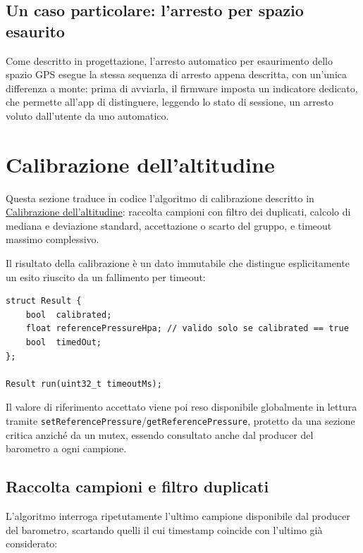 \subsection{Un caso particolare: l'arresto per spazio esaurito}
Come descritto in progettazione, l'arresto automatico per esaurimento dello
spazio GPS esegue la stessa sequenza di arresto appena descritta, con
un'unica differenza a monte: prima di avviarla, il firmware imposta un
indicatore dedicato, che permette all'app di distinguere, leggendo lo stato
di sessione, un arresto voluto dall'utente da uno automatico.

\newpage

\section{Calibrazione dell'altitudine}

Questa sezione traduce in codice l'algoritmo di calibrazione descritto in
\hyperref[sec:calibrazione-altitudine]{Calibrazione dell'altitudine}:
raccolta campioni con filtro dei duplicati, calcolo di mediana e deviazione
standard, accettazione o scarto del gruppo, e timeout massimo complessivo.

Il risultato della calibrazione è un dato immutabile che distingue
esplicitamente un esito riuscito da un fallimento per timeout:

\begin{listing}[H]
\begin{verbatim}
struct Result {
    bool  calibrated;
    float referencePressureHpa; // valido solo se calibrated == true
    bool  timedOut;
};

Result run(uint32_t timeoutMs);
\end{verbatim}
\caption{Interfaccia del modulo di calibrazione dell'altitudine}
\label{listing:altitude-cal-interface}
\end{listing}

Il valore di riferimento accettato viene poi reso disponibile globalmente in
lettura tramite \texttt{setReferencePressure}/\texttt{getReferencePressure},
protetto da una sezione critica anziché da un mutex, essendo consultato anche
dal producer del barometro a ogni campione.

\subsection{Raccolta campioni e filtro duplicati}
L'algoritmo interroga ripetutamente l'ultimo campione disponibile dal
producer del barometro, scartando quelli il cui timestamp coincide con
l'ultimo già considerato:

